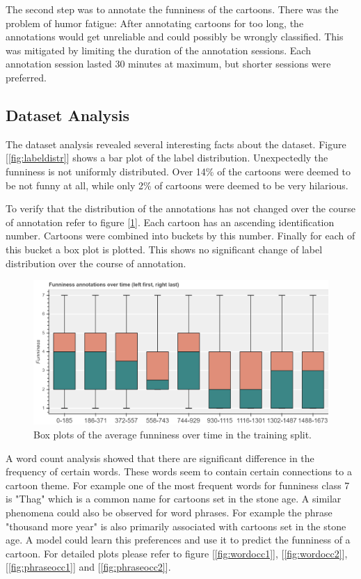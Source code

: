 \documentclass[draft,final,oneside]{vutinfth} %
\begin{document}
The second step was to annotate the funniness of the cartoons. There was the problem of humor fatigue: After annotating cartoons for too long, the annotations would get unreliable and could possibly be wrongly classified. This was mitigated by limiting the duration of the annotation sessions. Each annotation session lasted 30 minutes at maximum, but shorter sessions were preferred. 

\subsection{Dataset Analysis}

The dataset analysis revealed several interesting facts about the dataset. Figure [\ref{fig:labeldistr}] shows a bar plot of the label distribution. Unexpectedly the funniness is not uniformly distributed. Over 14\% of the cartoons were deemed to be not funny at all, while only 2\% of cartoons were deemed to be very hilarious.

To verify that the distribution of the annotations has not changed over the course of annotation refer to figure [\ref{fig:boxplottime}]. Each cartoon has an ascending identification number. Cartoons were  combined into buckets by this number. Finally for each of this bucket a box plot is plotted. This shows no significant change of label distribution over the course of annotation.

\begin{figure}
	\centering
  	\includegraphics[width=1.0\textwidth]{graphics/average_funniness_over_time}
	\caption{Box plots of the average funniness over time in the training split.}
	\label{fig:boxplottime}
\end{figure}

A word count analysis showed that there are significant difference in the frequency of certain words. These words seem to contain certain connections to a cartoon theme. For example one of the most frequent words for funniness class 7 is "Thag" which is a common name for cartoons set in the stone age. A similar phenomena could also be observed for word phrases. For example the phrase "thousand more year" is also primarily associated with cartoons set in the stone age. A model could learn this preferences and use it to predict the funniness of a cartoon. For detailed plots please refer to figure [\ref{fig:wordocc1}], [\ref{fig:wordocc2}], [\ref{fig:phraseocc1}] and [\ref{fig:phraseocc2}].
\end{document}
